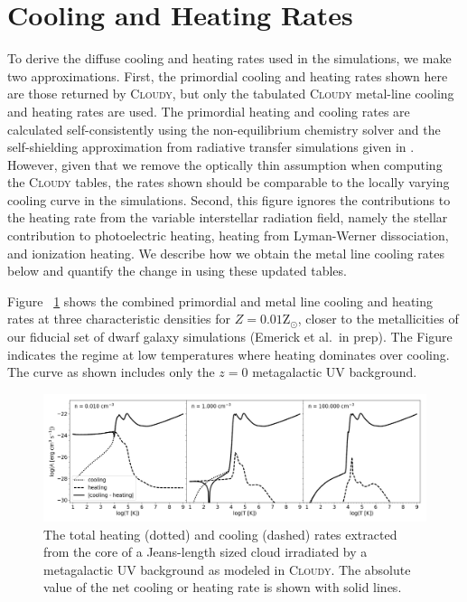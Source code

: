 \documentclass[twocolumn]{aastex61}
\begin{document}
\section{Cooling and Heating Rates}
\label{appendix:cooling}

To derive the diffuse cooling and heating rates used in the simulations, we make two approximations. First, the primordial cooling and heating rates shown here are those returned by \textsc{Cloudy}, but only the tabulated \textsc{Cloudy} metal-line cooling and heating rates are used. The primordial heating and cooling rates are calculated self-consistently using the non-equilibrium chemistry solver and the self-shielding approximation from radiative transfer simulations given in \citet{Rahmati2013}. However, given that we remove the optically thin assumption when computing the \textsc{Cloudy} tables, the rates shown should be comparable to the locally varying cooling curve in the simulations. Second, this figure ignores the contributions to the heating rate from the variable interstellar radiation field, namely the stellar contribution to photoelectric heating, heating from Lyman-Werner dissociation, and ionization heating. We describe how we obtain the metal line cooling rates below and quantify the change in using these updated tables. 

Figure ~\ref{fig:cooling} shows the combined primordial and metal line cooling and heating rates at three characteristic densities for $Z = 0.01 $Z$_{\odot}$, closer to the metallicities of our fiducial set of dwarf galaxy simulations (Emerick et al.\ in prep). The 
    Figure 
indicates the regime at low temperatures where heating dominates over cooling. The curve as shown includes 
   only
the $z = 0$ \citet{HM2012} metagalactic UV background.

\begin{figure}
\centering
\includegraphics[width=0.95\linewidth]{cooling_curve}
\caption{The total heating (dotted) and cooling (dashed) rates extracted from the core of a Jeans-length sized cloud irradiated by a \citet{HM2012} metagalactic UV background as modeled in \textsc{Cloudy}. The absolute value of the net cooling
   or heating
rate is shown with solid lines.}
\label{fig:cooling}
\end{figure}
\end{document}
